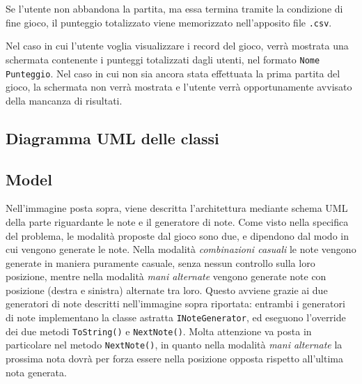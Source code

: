 Se l'utente non abbandona la partita, ma essa termina tramite la condizione di fine gioco, il punteggio totalizzato viene memorizzato nell'apposito file \texttt{.csv}.
\vspace{0.5cm}

Nel caso in cui l'utente voglia visualizzare i record del gioco, verrà mostrata una schermata contenente i punteggi totalizzati dagli utenti, nel formato \texttt{Nome Punteggio}. Nel caso in cui non sia ancora stata effettuata la prima partita del gioco, la schermata non verrà mostrata e l'utente verrà opportunamente avvisato della mancanza di risultati.

\newpage
\subsection{Diagramma UML delle classi}
\vspace{2cm}
\begin{figure}[h]
\end{figure}

\newpage
\subsection{Model}
\begin{figure}[h]
\end{figure}
\vspace{1cm}

Nell'immagine posta sopra, viene descritta l'architettura mediante schema UML della parte riguardante le note e il generatore di note. Come visto nella specifica del problema, le modalità proposte dal gioco sono due, e dipendono dal modo in cui vengono generate le note. Nella modalità \emph{combinazioni casuali} le note vengono generate in maniera puramente casuale, senza nessun controllo sulla loro posizione, mentre nella modalità \emph{mani alternate} vengono generate note con posizione (destra e sinistra) alternate tra loro. Questo avviene grazie ai due generatori di note descritti nell'immagine sopra riportata: entrambi i generatori di note implementano la classe astratta \texttt{INoteGenerator}, ed eseguono l'override dei due metodi \texttt{ToString()} e \texttt{NextNote()}. Molta attenzione va posta in particolare nel metodo \texttt{NextNote()}, in quanto nella modalità \emph{mani alternate} la prossima nota dovrà per forza essere nella posizione opposta rispetto all'ultima nota generata.

